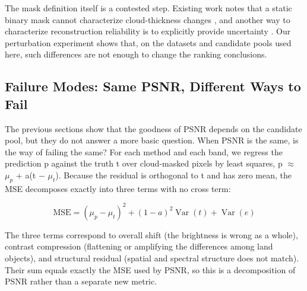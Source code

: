 \documentclass[a4paper,fleqn]{cas-dc}
\begin{document}
The mask definition itself is a contested step. Existing work notes that a static binary mask cannot characterize cloud-thickness changes \cite{ref31}, and another way to characterize reconstruction reliability is to explicitly provide uncertainty \cite{ref26}. Our perturbation experiment shows that, on the datasets and candidate pools used here, such differences are not enough to change the ranking conclusions.

\subsection{Failure Modes: Same PSNR, Different Ways to Fail}

The previous sections show that the goodness of PSNR depends on the candidate pool, but they do not answer a more basic question. When PSNR is the same, is the way of failing the same? For each method and each band, we regress the prediction p against the truth t over cloud-masked pixels by least squares, p $\approx$ $\mu_p$ + a(t $-$ $\mu_t$). Because the residual is orthogonal to t and has zero mean, the MSE decomposes exactly into three terms with no cross term:

\begin{equation}
\mathrm{MSE}=(\mu_{p}-\mu_{t})^{2}
+(1-a)^{2}\operatorname{Var}(t)+\operatorname{Var}(e)
\label{eq:decomp}
\end{equation}

The three terms correspond to overall shift (the brightness is wrong as a whole), contrast compression (flattening or amplifying the differences among land objects), and structural residual (spatial and spectral structure does not match). Their sum equals exactly the MSE used by PSNR, so this is a decomposition of PSNR rather than a separate new metric.
\end{document}
